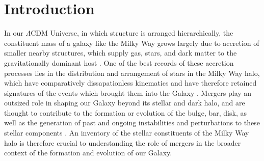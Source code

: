 
\section{Introduction}

In our $\Lambda$CDM Universe, in which structure is arranged hierarchically, the constituent mass of a galaxy like the Milky Way grows largely due to accretion of smaller nearby structures, which supply gas, stars, and dark matter to the gravitationally dominant host \parencite{searle78,white91,helmi99,bullock05}. One of the best records of these accretion processes lies in the distribution and arrangement of stars in the Milky Way halo, which have comparatively dissapationless kinematics and have therefore retained signatures of the events which brought them into the Galaxy \parencite{freeman02,johnston08}. Mergers play an outsized role in shaping our Galaxy beyond its stellar and dark halo, and are thought to contribute to the formation or evolution of the bulge, bar, disk, as well as the generation of past and ongoing instabilities and perturbations to these stellar components \parencite[][]{bland-hawthorn16,helmi20}. An inventory of the stellar constituents of the Milky Way halo is therefore crucial to understanding the role of mergers in the broader context of the formation and evolution of our Galaxy.

